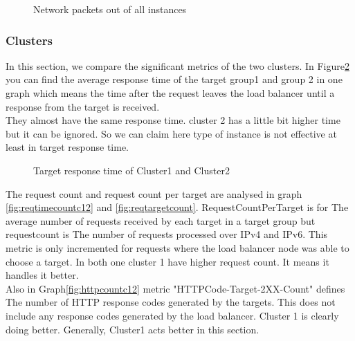 \documentclass[12pt]{article}
\begin{document}
    \begin{figure}[htpb]
        \centering
            \caption{Network packets out of all instances}
            \label{fig:netout}
        \end{figure}


        
        \subsubsection{Clusters}
            In this section, we compare the significant metrics of the two clusters. In Figure\ref{fig:targerresponsetimec12} you can find the average response time of the target group1 and group 2 in one graph which means the time after the request leaves the load balancer until a response from the target is received.\\
            They almost have the same response time. cluster 2 has a little bit higher time but it can be ignored. So we can claim here type of instance is not effective at least in target response time.\\
          
                \begin{figure}[htpb]
                \centering
                    \caption{Target response time of Cluster1 and Cluster2}
                    \label{fig:targerresponsetimec12}
                \end{figure}


                The request count and request count per target are analysed in graph \ref{fig:reqtimecountc12} and \ref{fig:reqtargetcount}. RequestCountPerTarget is for The average number of requests received by each target in a target group but requestcount is The number of requests processed over IPv4 and IPv6. This metric is only incremented for requests where the load balancer node was able to choose a target. In both one cluster 1 have higher request count. It means it handles it better.\\
                Also in Graph\ref{fig:httpcountc12} metric "HTTPCode-Target-2XX-Count" defines The number of HTTP response codes generated by the targets. This does not include any response codes generated by the load balancer. Cluster 1 is clearly doing better. Generally, Cluster1 acts better in this section.
\end{document}
